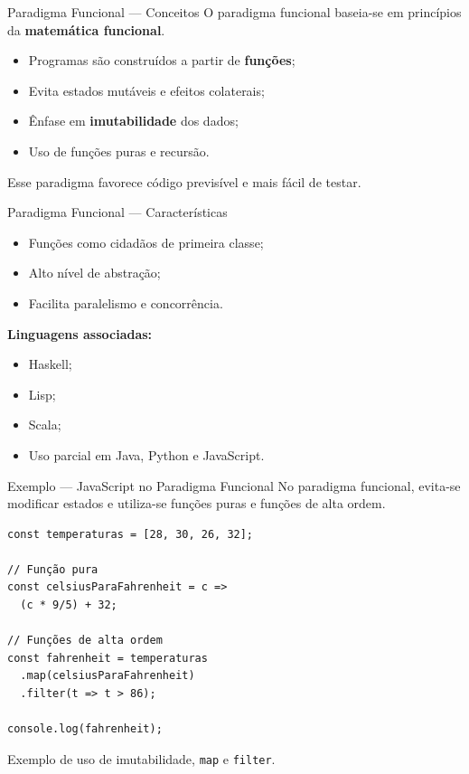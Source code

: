 \documentclass[9pt]{beamer}
\begin{document}
\begin{frame}{Paradigma Funcional — Conceitos}
O paradigma funcional baseia-se em princípios da \textbf{matemática funcional}.

\begin{itemize}
  \item Programas são construídos a partir de \textbf{funções};
  \item Evita estados mutáveis e efeitos colaterais;
  \item Ênfase em \textbf{imutabilidade} dos dados;
  \item Uso de funções puras e recursão.
\end{itemize}
Esse paradigma favorece código previsível e mais fácil de testar.
\end{frame}
\begin{frame}{Paradigma Funcional — Características}
\begin{itemize}
  \item Funções como cidadãos de primeira classe;
  \item Alto nível de abstração;
  \item Facilita paralelismo e concorrência.
\end{itemize}

\textbf{Linguagens associadas:}
\begin{itemize}
  \item Haskell;
  \item Lisp;
  \item Scala;
  \item Uso parcial em Java, Python e JavaScript.
\end{itemize}
\end{frame}
\begin{frame}[fragile]{Exemplo — JavaScript no Paradigma Funcional}
No paradigma funcional, evita-se modificar estados e utiliza-se
funções puras e funções de alta ordem.

\begin{verbatim}
const temperaturas = [28, 30, 26, 32];

// Função pura
const celsiusParaFahrenheit = c =>
  (c * 9/5) + 32;

// Funções de alta ordem
const fahrenheit = temperaturas
  .map(celsiusParaFahrenheit)
  .filter(t => t > 86);

console.log(fahrenheit);
\end{verbatim}

\small
Exemplo de uso de imutabilidade, \texttt{map} e \texttt{filter}.
\end{frame}
\end{document}
